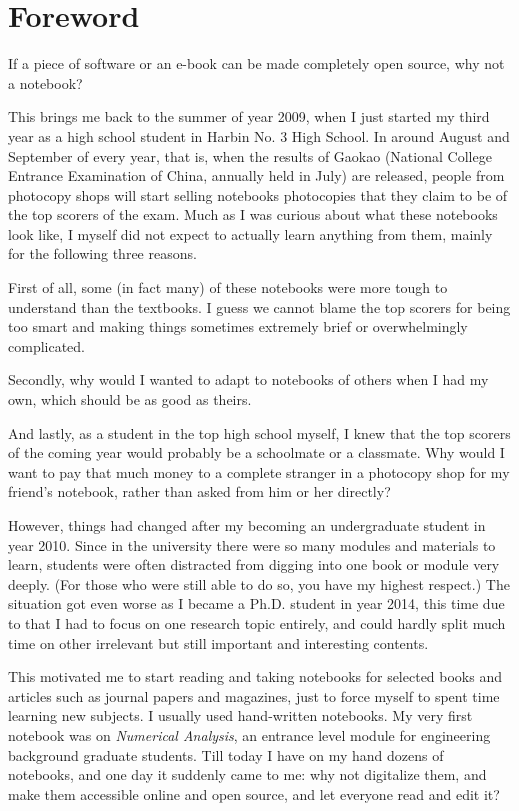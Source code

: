 \chapter*{Foreword}
If a piece of software or an e-book can be made completely open source, why not a notebook?

This brings me back to the summer of year 2009, when I just started my third year as a high school student in Harbin No. 3 High School. In around August and September of every year, that is, when the results of Gaokao (National College Entrance Examination of China, annually held in July) are released, people from photocopy shops will start selling notebooks photocopies that they claim to be of the top scorers of the exam. Much as I was curious about what these notebooks look like, I myself did not expect to actually learn anything from them, mainly for the following three reasons.

First of all, some (in fact many) of these notebooks were more tough to understand than the textbooks. I guess we cannot blame the top scorers for being too smart and making things sometimes extremely brief or overwhelmingly complicated.

Secondly, why would I wanted to adapt to notebooks of others when I had my own, which should be as good as theirs.

And lastly, as a student in the top high school myself, I knew that the top scorers of the coming year would probably be a schoolmate or a classmate. Why would I want to pay that much money to a complete stranger in a photocopy shop for my friend's notebook, rather than asked from him or her directly?

However, things had changed after my becoming an undergraduate student in year 2010. Since in the university there were so many modules and materials to learn, students were often distracted from digging into one book or module very deeply. (For those who were still able to do so, you have my highest respect.) The situation got even worse as I became a Ph.D. student in year 2014, this time due to that I had to focus on one research topic entirely, and could hardly split much time on other irrelevant but still important and interesting contents.

This motivated me to start reading and taking notebooks for selected books and articles such as journal papers and magazines, just to force myself to spent time learning new subjects. I usually used hand-written notebooks. My very first notebook was on \textit{Numerical Analysis}, an entrance level module for engineering background graduate students. Till today I have on my hand dozens of notebooks, and one day it suddenly came to me: why not digitalize them, and make them accessible online and open source, and let everyone read and edit it?

